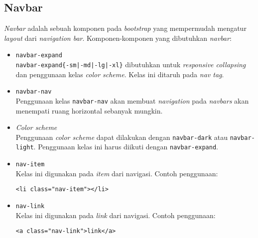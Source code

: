 \subsection{Navbar}

\textit{Navbar} adalah sebuah komponen pada \textit{bootstrap} yang mempermudah mengatur \textit{layout} dari \textit{navigation bar}. Komponen-komponen yang dibutuhkan \textit{navbar}:

\begin{itemize}
	\item \texttt{navbar-expand} \\
	\texttt{navbar-expand\{-sm|-md|-lg|-xl\}} dibutuhkan untuk \textit{responsive collapsing} dan penggunaan kelas \textit{color scheme}. Kelas ini ditaruh pada \textit{nav tag}.
	
	\item \texttt{navbar-nav} \\
	Penggunaan kelas \texttt{navbar-nav} akan membuat \textit{navigation} pada \textit{navbars} akan menempati ruang horizontal sebanyak mungkin. 
	
	\item \textit{Color scheme} \\
	Penggunaan \textit{color scheme} dapat dilakukan dengan \texttt{navbar-dark} atau \texttt{navbar-light}. Penggunaan kelas ini harus diikuti dengan \texttt{navbar-expand}.
	
	\item \texttt{nav-item} \\
	Kelas ini digunakan pada \textit{item} dari navigasi. Contoh penggunaan:
	\begin{lstlisting}
<li class="nav-item"></li>
	\end{lstlisting}
	
	\item \texttt{nav-link} \\
	Kelas ini digunakan pada \textit{link} dari navigasi. Contoh penggunaan:
	\begin{lstlisting}
<a class="nav-link">link</a>	
	\end{lstlisting}
\end{itemize}



 
